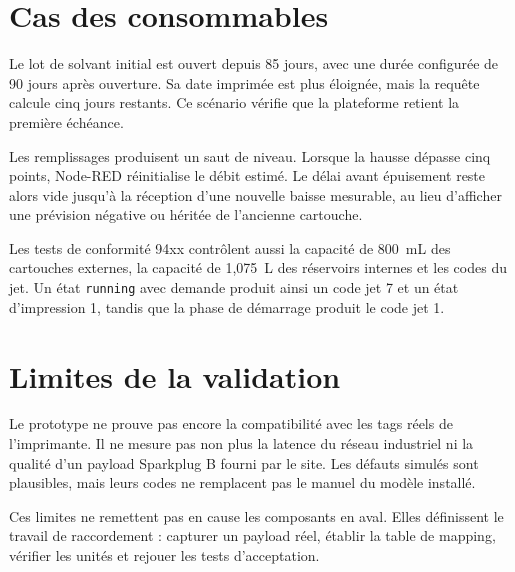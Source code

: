 \section{Cas des consommables}

Le lot de solvant initial est ouvert depuis 85 jours, avec une durée
configurée de 90 jours après ouverture. Sa date imprimée est plus éloignée,
mais la requête calcule cinq jours restants. Ce scénario vérifie que la plateforme
retient la première échéance.

Les remplissages produisent un saut de niveau. Lorsque la hausse dépasse cinq
points, Node-RED réinitialise le débit estimé. Le délai avant épuisement reste
alors vide jusqu'à la réception d'une nouvelle baisse mesurable, au lieu
d'afficher une prévision négative ou héritée de l'ancienne cartouche.

Les tests de conformité 94xx contrôlent aussi la capacité de 800~mL des
cartouches externes, la capacité de 1,075~L des réservoirs internes et les codes
du jet. Un état \texttt{running} avec demande produit ainsi un code jet 7 et un
état d'impression 1, tandis que la phase de démarrage produit le code jet 1.

\section{Limites de la validation}

Le prototype ne prouve pas encore la compatibilité avec les tags réels de
l'imprimante. Il ne mesure pas non plus la latence du réseau industriel ni la
qualité d'un payload Sparkplug B fourni par le site. Les défauts simulés sont
plausibles, mais leurs codes ne remplacent pas le manuel du modèle installé.

Ces limites ne remettent pas en cause les composants en aval. Elles définissent
le travail de raccordement : capturer un payload réel, établir la table de
mapping, vérifier les unités et rejouer les tests d'acceptation.
